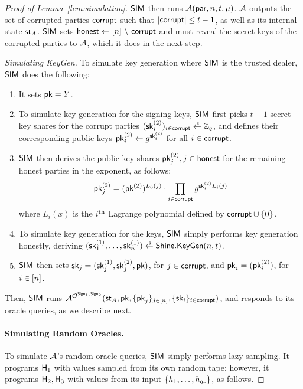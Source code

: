 \begin{proof}[Proof of Lemma~\ref{lem:simulation}]
  $\mathsf{SIM}$ then runs $\mathcal{A}(\mathsf{par}, n, t, \mu)$.
  $\mathcal{A}$ outputs the set of corrupted parties $\mathsf{corrupt} $ such that $\lvert  \mathsf{corrupt} \rvert \leq t-1$,
  as well as its internal state $\mathsf{st}_A$.
  $\mathsf{SIM}$ sets $\mathsf{honest} \gets [n]~\backslash~\mathsf{corrupt}$ and must reveal the secret keys of the corrupted parties to $\mathcal{A}$,
  which it does in the next step.

  \medskip


  \noindent\textit{Simulating KeyGen.}
    To simulate key generation where $\mathsf{SIM}$ is the trusted dealer,
    $\mathsf{SIM}$ does the following:
    \begin{enumerate}
    \item It sets $\mathsf{pk} = Y$.
    \item To simulate key generation for the signing keys,
    $\mathsf{SIM}$ first picks $t-1$ secret key shares for the corrupt parties $(\sksign_i)_{i \in \corrupt} \rgets \Zq$,
    and defines their corresponding public keys $\mathsf{pk}^{(2)}_i \gets g^{\mathsf{sk}^{(2)}_i}$ for all $i \in \mathsf{corrupt}$.
    \item $\mathsf{SIM}$ then derives the public key shares $\mathsf{pk}^{(2)}_j, j \in \mathsf{honest}$ for the remaining honest parties in the exponent, as follows:
  \begin{align} \label{eq:keygen-sim-arctic}
    \mathsf{pk}^{(2)}_j = (\mathsf{pk}^{(2)})^{L_0(j)} \cdot \prod_{i \in \mathsf{corrupt}} g^{\mathsf{sk}^{(2)}_i L_i(j)}
	\end{align}
        where $L_i(x)$ is the $i^{\textrm{\scriptsize th}}$ Lagrange polynomial defined by $\mathsf{corrupt} \cup \{0\}$.
      \item To simulate key generation for the \DVRFOne keys,
  $\mathsf{SIM}$ simply performs key generation honestly,
  deriving $(\skrand_1, \ldots, \skrand_n) \rgets \DVRFOnem.\keygen(n, t)$.
\item $\mathsf{SIM}$ then sets $\mathsf{sk}_j = (\mathsf{sk}^{(1)}_j, \mathsf{sk}^{(2)}_j, \mathsf{pk})$, for $j \in \mathsf{corrupt}$,
  and $\mathsf{pk}_i = (\mathsf{pk}^{(2)}_i)$, for $i \in [n]$.
    \end{enumerate}


  Then,
  $\mathsf{SIM}$ runs
  $\mathcal{A}^{ \mathcal{O}^{\mathsf{Sign}_1, \mathsf{Sign}_2} }(\mathsf{st}_A, \mathsf{pk}, \{ \mathsf{pk}_j \}_{j \in [n]}, \{ \mathsf{sk}_i \}_{i \in \mathsf{corrupt}})$,
  and responds to its oracle queries,
  as we describe next.

  \medskip

  \paragraph{Simulating Random Oracles.}
  To simulate $\mathcal{A}$'s random oracle queries,
  $\mathsf{SIM}$ simply performs lazy sampling.
  It programs $\mathsf{H}_1$ with values sampled from its own random tape;
  however, it programs $\mathsf{H}_2, \mathsf{H}_3$ with values from its input
  $\{h_1, \ldots, h_{q_r} \}$,
  as follows.


\end{proof}
